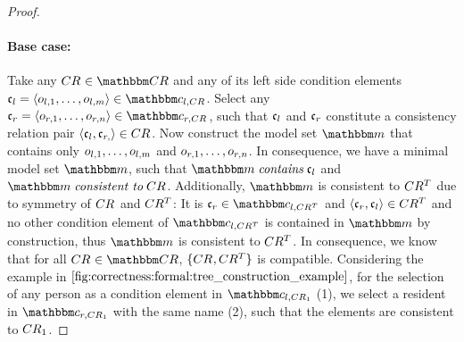 \begin{proof}
    \paragraph{Base case:}
    Take any $\consistencyrelation{CR}{} \in \consistencyrelationset{CR}$ and any of its left side condition elements $\conditionelement{c}{l} = \tupled{\object{o}{l,1}, \dots, \object{o}{l,m}} \in \condition{c}{l, \consistencyrelation{CR}{}}$.
    Select any $\conditionelement{c}{r} = \tupled{\object{o}{r,1}, \dots, \object{o}{r,n}} \in \condition{c}{r, \consistencyrelation{CR}{}}$, such that $\mathfrak{c}_{l}$ and $\mathfrak{c}_{r}$ constitute a consistency relation pair $\langle \mathfrak{c}_{l}, \mathfrak{c}_{r,} \rangle \in CR_{}$.
    Now construct the model set $\modelset{m}$ that contains only $o_{l,1}, \dots, o_{l,m}$ and $o_{r,1}, \dots, o_{r,n}$. %
    In consequence, we have a minimal model set $\modelset{m}$, such that $\modelset{m} \containsmath \conditionelement{c}{l}$ and $\modelset{m} \consistenttomath \consistencyrelation{CR}{}$.
    Additionally, $\modelset{m}$ is consistent to $CR^T_{}$ due to symmetry of $CR_{}$ and $CR^T_{}$: It is $\conditionelement{c}{r} \in \condition{c}{l,\consistencyrelation{CR^T}{}}$ and $\langle \mathfrak{c}_{r}, \mathfrak{c}_{l} \rangle \in CR^T_{}$ and no other condition element of $\condition{c}{l,\consistencyrelation{CR^T}{}}$ is contained in $\modelset{m}$ by construction, thus $\modelset{m}$ is consistent to $CR^T_{}$.
    In consequence, we know that for all $\consistencyrelation{CR}{} \in \consistencyrelationset{CR}$, $\{ CR_{}, CR^T_{} \}$ is compatible. 
    Considering the example in $\autoref{fig:correctness:formal:tree_construction_example}$, for the selection of any person as a condition element in $\condition{c}{l,\consistencyrelation{CR}{1}}$ (1), we select a resident in $\condition{c}{r,\consistencyrelation{CR}{1}}$ with the same name (2), such that the elements are consistent to $CR_{1}$.
    

\end{proof}
